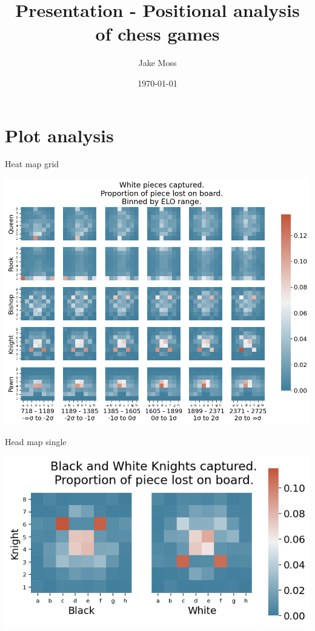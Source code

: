 \documentclass[presentation, 8pt]{beamer}
\author{Jake Moss}
\date{\today}
\title{Presentation - Positional analysis of chess games}
\begin{document}
\maketitle
\section{Plot analysis}
\label{sec:org95fd096}
\begin{frame}[label={sec:org0dc23d0}]{Heat map grid}
\begin{center}
\includegraphics[width=.9\linewidth]{Images/_HEATMAP_Queen_Rook_Bishop_Knight_Pawn_WHITE_ELO_FISC.png}
\end{center}
\end{frame}
\begin{frame}[label={sec:org655b225}]{Head map single}
\begin{center}
\includegraphics[width=.9\linewidth]{Images/_HEATMAP_Knight_FISC.png}
\end{center}
\end{frame}
\end{document}
